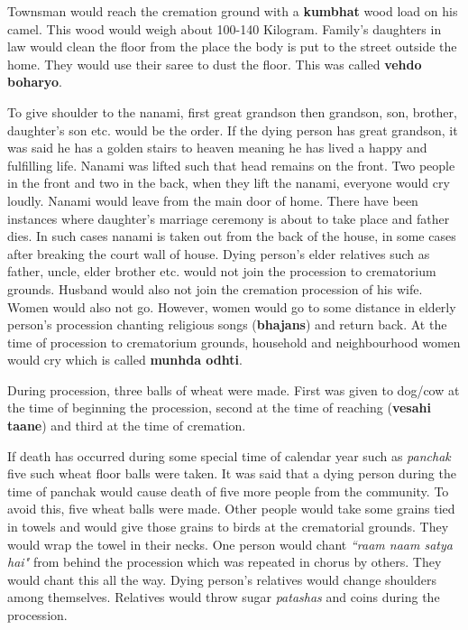Townsman would reach the cremation ground with a \textbf{kumbhat} wood load on
his camel. This wood would weigh about 100-140 Kilogram. Family's daughters in
law would clean the floor from the place the body is put to the street outside
the home. They would use their saree to dust the floor. This was called
\textbf{vehdo boharyo}.

To give shoulder to the nanami, first great grandson then grandson, son,
brother, daughter's son etc. would be the order. If the dying person has great
grandson, it was said he has a golden stairs to heaven meaning he has lived a
happy and fulfilling life. Nanami was lifted such that head remains on the
front. Two people in the front and two in the back, when they lift the nanami,
everyone would cry loudly. Nanami would leave from the main door of home. There
have been instances where daughter's marriage ceremony is about to take place
and father dies. In such cases nanami is taken out from the back of the house,
in some cases after breaking the court wall of house. Dying person's elder
relatives such as father, uncle, elder brother etc. would not join the
procession to crematorium grounds. Husband would also not join the cremation
procession of his wife. Women would also not go. However, women would go to
some distance in elderly person's procession chanting religious songs
(\textbf{bhajans}) and return back. At the time of procession to crematorium
grounds, household and neighbourhood women would cry which is called
\textbf{munhda odhti}. 

During procession, three balls of wheat were made. First was given to dog/cow
at the time of beginning the procession, second at the time of reaching
(\textbf{vesahi taane}) and third at the time of cremation.

If death has occurred during some special time of calendar year such as
\textit{panchak} five such wheat floor balls were taken. It was said that a
dying person during the time of panchak would cause death of five more people
from the community. To avoid this, five wheat balls were made. Other people
would take some grains tied in towels and would give those grains to birds at
the crematorial grounds. They would wrap the towel in their necks. One person
would chant \textit{``raam naam satya hai"} from behind the procession which was
repeated in chorus by others. They would chant this all the way. Dying person's
relatives would change shoulders among themselves. Relatives would throw sugar
\textit{patashas} and coins during the procession.

